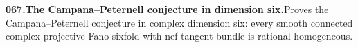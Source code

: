 \documentclass[11pt,a4paper]{article}
\begin{document}
  \par \begin{minipage}{\linewidth}
  \fontsize{10.5}{12.6}\selectfont\RaggedRight
  \hypertarget{result 067}{}
  {\bfseries\textcolor{muted}{067.}\enspace The Campana--Peternell conjecture in dimension six.}\enspace Proves the Campana--Peternell conjecture in complex dimension six: every smooth connected complex projective Fano sixfold with nef tangent bundle is rational homogeneous.\par
  \end{minipage}\par\vspace{5pt}
\end{document}
